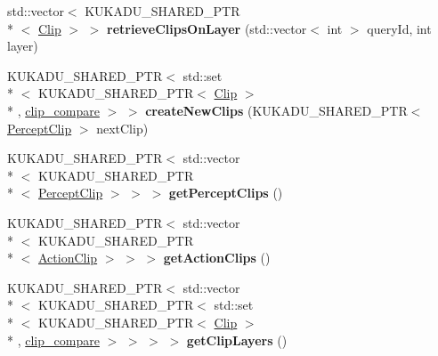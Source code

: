 \begin{DoxyCompactItemize}
\item 
\hypertarget{classkukadu_1_1ProjectiveSimulator_a4b05eb50a4d1e67a8b8d2efb66101c4b}{std\-::vector$<$ K\-U\-K\-A\-D\-U\-\_\-\-S\-H\-A\-R\-E\-D\-\_\-\-P\-T\-R\\*
$<$ \hyperlink{classkukadu_1_1Clip}{Clip} $>$ $>$ {\bfseries retrieve\-Clips\-On\-Layer} (std\-::vector$<$ int $>$ query\-Id, int layer)}\label{classkukadu_1_1ProjectiveSimulator_a4b05eb50a4d1e67a8b8d2efb66101c4b}

\item 
\hypertarget{classkukadu_1_1ProjectiveSimulator_a4a89d7e3be9a430d2d9408ea45b118fd}{K\-U\-K\-A\-D\-U\-\_\-\-S\-H\-A\-R\-E\-D\-\_\-\-P\-T\-R$<$ std\-::set\\*
$<$ K\-U\-K\-A\-D\-U\-\_\-\-S\-H\-A\-R\-E\-D\-\_\-\-P\-T\-R$<$ \hyperlink{classkukadu_1_1Clip}{Clip} $>$\\*
, \hyperlink{structkukadu_1_1clip__compare}{clip\-\_\-compare} $>$ $>$ {\bfseries create\-New\-Clips} (K\-U\-K\-A\-D\-U\-\_\-\-S\-H\-A\-R\-E\-D\-\_\-\-P\-T\-R$<$ \hyperlink{classkukadu_1_1PerceptClip}{Percept\-Clip} $>$ next\-Clip)}\label{classkukadu_1_1ProjectiveSimulator_a4a89d7e3be9a430d2d9408ea45b118fd}

\item 
\hypertarget{classkukadu_1_1ProjectiveSimulator_a9ef2a9e013f08283106eda01a99d71c3}{K\-U\-K\-A\-D\-U\-\_\-\-S\-H\-A\-R\-E\-D\-\_\-\-P\-T\-R$<$ std\-::vector\\*
$<$ K\-U\-K\-A\-D\-U\-\_\-\-S\-H\-A\-R\-E\-D\-\_\-\-P\-T\-R\\*
$<$ \hyperlink{classkukadu_1_1PerceptClip}{Percept\-Clip} $>$ $>$ $>$ {\bfseries get\-Percept\-Clips} ()}\label{classkukadu_1_1ProjectiveSimulator_a9ef2a9e013f08283106eda01a99d71c3}

\item 
\hypertarget{classkukadu_1_1ProjectiveSimulator_a41b6e2ac27ec4ecc22361fa5e7569699}{K\-U\-K\-A\-D\-U\-\_\-\-S\-H\-A\-R\-E\-D\-\_\-\-P\-T\-R$<$ std\-::vector\\*
$<$ K\-U\-K\-A\-D\-U\-\_\-\-S\-H\-A\-R\-E\-D\-\_\-\-P\-T\-R\\*
$<$ \hyperlink{classkukadu_1_1ActionClip}{Action\-Clip} $>$ $>$ $>$ {\bfseries get\-Action\-Clips} ()}\label{classkukadu_1_1ProjectiveSimulator_a41b6e2ac27ec4ecc22361fa5e7569699}

\item 
\hypertarget{classkukadu_1_1ProjectiveSimulator_a095634e6ccec95d061b9327c74c548f7}{K\-U\-K\-A\-D\-U\-\_\-\-S\-H\-A\-R\-E\-D\-\_\-\-P\-T\-R$<$ std\-::vector\\*
$<$ K\-U\-K\-A\-D\-U\-\_\-\-S\-H\-A\-R\-E\-D\-\_\-\-P\-T\-R$<$ std\-::set\\*
$<$ K\-U\-K\-A\-D\-U\-\_\-\-S\-H\-A\-R\-E\-D\-\_\-\-P\-T\-R$<$ \hyperlink{classkukadu_1_1Clip}{Clip} $>$\\*
, \hyperlink{structkukadu_1_1clip__compare}{clip\-\_\-compare} $>$ $>$ $>$ $>$ {\bfseries get\-Clip\-Layers} ()}\label{classkukadu_1_1ProjectiveSimulator_a095634e6ccec95d061b9327c74c548f7}


\end{DoxyCompactItemize}
